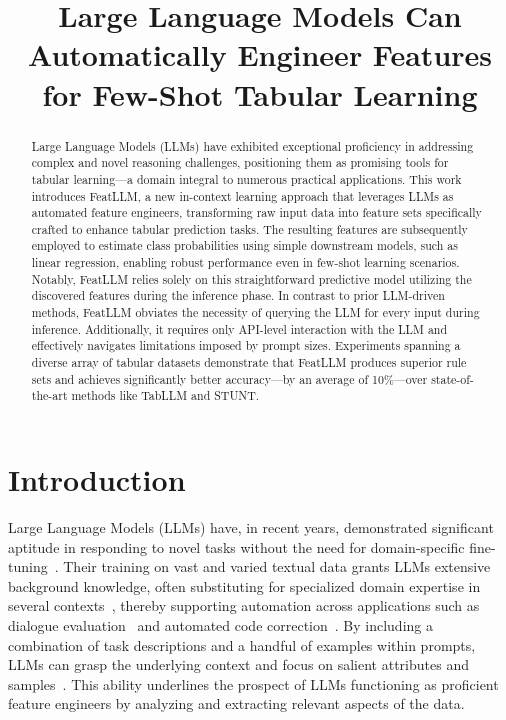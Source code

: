 \title{Large Language Models Can Automatically Engineer Features for Few-Shot Tabular Learning}

\begin{abstract}
Large Language Models (LLMs) have exhibited exceptional proficiency in addressing complex and novel reasoning challenges, positioning them as promising tools for tabular learning—a domain integral to numerous practical applications. This work introduces \textsf{FeatLLM}, a new in-context learning approach that leverages LLMs as automated feature engineers, transforming raw input data into feature sets specifically crafted to enhance tabular prediction tasks. The resulting features are subsequently employed to estimate class probabilities using simple downstream models, such as linear regression, enabling robust performance even in few-shot learning scenarios. Notably, \textsf{FeatLLM} relies solely on this straightforward predictive model utilizing the discovered features during the inference phase. In contrast to prior LLM-driven methods, \textsf{FeatLLM} obviates the necessity of querying the LLM for every input during inference. Additionally, it requires only API-level interaction with the LLM and effectively navigates limitations imposed by prompt sizes. Experiments spanning a diverse array of tabular datasets demonstrate that \textsf{FeatLLM} produces superior rule sets and achieves significantly better accuracy—by an average of 10\%—over state-of-the-art methods like TabLLM and STUNT.
\end{abstract}

\section{Introduction}
Large Language Models (LLMs) have, in recent years, demonstrated significant aptitude in responding to novel tasks without the need for domain-specific fine-tuning~\cite{creswell2022selection,imani2023mathprompter,taylor2022galactica}. Their training on vast and varied textual data grants LLMs extensive background knowledge, often substituting for specialized domain expertise in several contexts~\cite{Genomes2021,singhal2023large,wilcox2003role}, thereby supporting automation across applications such as dialogue evaluation~\cite{finch2023leveraging} and automated code correction~\cite{fan2023automated}. By including a combination of task descriptions and a handful of examples within prompts, LLMs can grasp the underlying context and focus on salient attributes and samples~\cite{brown2020language,zhao2023survey}. This ability underlines the prospect of LLMs functioning as proficient feature engineers by analyzing and extracting relevant aspects of the data.

